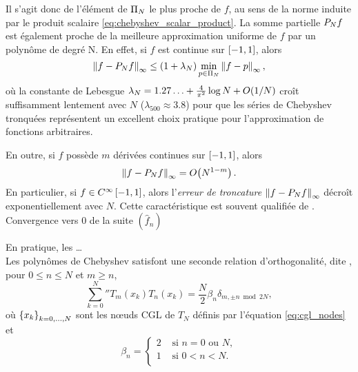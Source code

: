 Il s'agit donc de l'élément de $\polyspace{N}$ le plus proche de $f$, au sens de la norme induite par le produit scalaire \eqref{eq:chebyshev_scalar_product}.
La somme partielle $\truncseries{f}{N}$ est également proche de la meilleure approximation uniforme de $f$ par un polynôme de degré N. En effet, si $f$ est continue sur $\chebinterval$, alors
\begin{equation}
	\norminf{f - \truncseries{f}{N}} 
	\leq 
	\left(1 + \lambda_N \right) 
	\min_{p \in \polyspace{N}} \norminf{f - p},
	\label{eq:chebyshev_near_minimax}
\end{equation}
où la constante de Lebesgue $\lambda_N = 1.27\ldots + \frac{4}{\pi^2} \log N + \bigO{1/N}$ croît suffisamment lentement avec $N$ ($\lambda_{500} \approx 3.8$) pour que les séries de Chebyshev tronquées représentent un excellent choix pratique pour l'approximation de fonctions arbitraires.\par
En outre, si $f$ possède $m$ dérivées continues sur $\chebinterval$, alors
\begin{equation}
	\norminf{f - \truncseries{f}{N}} = \bigO{N^{1-m}}.
	\label{eq:chebyshev_spectral_accuracy}
\end{equation}
En particulier, si $f \in C^{\infty}\chebinterval$, alors l'\textit{erreur de troncature} $\norminf{f - \truncseries{f}{N}}$ décroît exponentiellement avec $N$. 
Cette caractéristique est souvent qualifiée de .\\
Convergence vers 0 de la suite $(\hat{f}_n)$
\par\bigskip

En pratique, les  \ldots\\
Les polynômes de Chebyshev satisfont une seconde relation d'orthogonalité, dite , pour $0 \leq n \leq N$ et $m \geq n$,
\begin{equation}
	\sum_{k=0}^{N}{''} T_m(x_k) T_n(x_k) = 
	\frac{N}{2} \beta_n \delta_{m,\pm n \bmod{2N}},
	\label{eq:chebyshev_discrete_orthogonality}
\end{equation}
où $\family{x}{k}{0}{N}$ sont les n\oe uds CGL de $T_N$ définis par l'équation \eqref{eq:cgl_nodes} et
\begin{equation}
	\beta_n = 
	\begin{cases}
	 2 & \text{\ si\ } n = 0 \text{\ ou\ } N,   \\ 
	 1 & \text{\ si\ } 0 < n < N.\\ 
	\end{cases}
\end{equation}

